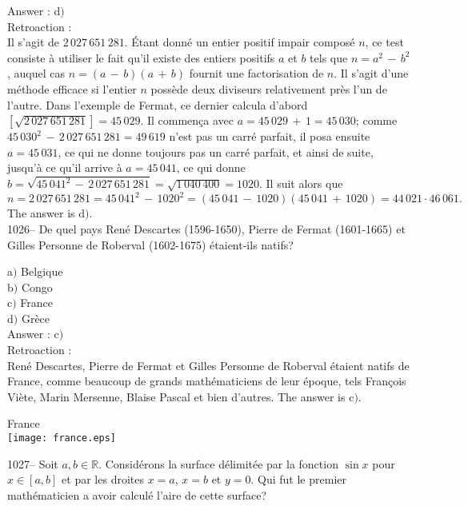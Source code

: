 ﻿\documentclass[letterpaper, 12pt]{article}
\begin{document}
Answer : d$)$\\

Retroaction : \\
Il s'agit de $2\,027\,651\,281$. \'Etant donn\'e un entier positif
impair compos\'e $n$, ce test consiste \`a utiliser le fait qu'il
existe des entiers positifs $a$ et $b$ tels que $n=a^2\,-\,b^2$,
auquel cas $n=(a\,-\,b)(a\,+\,b)$ fournit une factorisation de $n$.
Il s'agit d'une m\'ethode efficace si l'entier $n$ poss\`ede deux
diviseurs relativement pr\`es l'un de l'autre. Dans l'exemple de
Fermat, ce dernier calcula d'abord $[\sqrt{
2\,027\,651\,281}]=45\,029$. Il commen\c ca avec
$a=45\,029\,+\,1=45\,030$; comme
$45\,030^2\,-\,2\,027\,651\,281=49\,619$ n'est pas un carr\'e
parfait, il posa ensuite $a=45\,031$, ce qui ne donne toujours pas
un carr\'e parfait, et ainsi de suite, jusqu'\`a ce qu'il arrive \`a
$a=45\,041$, ce qui donne
$b=\sqrt{45\,041^2\,-\,2\,027\,651\,281}=\sqrt{1\,040\,400}=1020$.
Il suit alors que
$$n=2\,027\,651\,281=45\,041^2\,-\,1020^2=(45\,041\,-\,1020)(45\,041\,+\,1020)=44\,021\cdot46\,061.$$
The answer is d$)$.\\

1026-- De quel pays Ren\'e Descartes (1596-1650), Pierre de Fermat
(1601-1665) et Gilles Personne de Roberval (1602-1675) \'etaient-ils
natifs?

a$)$ Belgique  \\
b$)$ Congo \\
c$)$ France  \\
d$)$ Gr\`ece\\

Answer : c$)$\\

Retroaction :\\
Ren\'e Descartes, Pierre de Fermat et Gilles Personne de Roberval
\'etaient natifs de France, comme beaucoup de grands
math\'ematiciens de leur \'epoque, tels Fran\c cois Vi\`ete, Marin
Mersenne, Blaise Pascal et bien d'autres. The answer is c$)$.

        \begin{center}
        France\\
    \texttt{[image: france.eps]}\\
    \end{center}

1027-- Soit $a,b\in\mathbb{R}$. Consid\'erons la surface
d\'elimit\'ee par la fonction $\sin x$ pour $x\in[a,b]$ et par les
droites $x=a$, $x=b$ et $y=0$. Qui fut le premier math\'ematicien a
avoir calcul\'e l'aire de cette surface?
\end{document}
